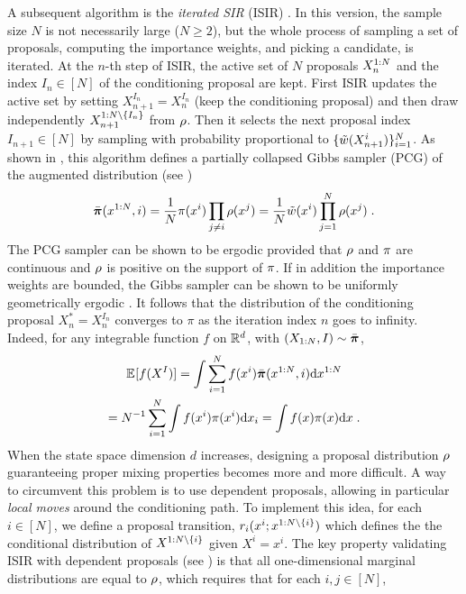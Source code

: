 \documentclass{article}
\begin{document}
A subsequent algorithm  is the \emph{iterated SIR} (ISIR) \citep{andrieu2010particle}. In this version, the sample size $N$ is not necessarily large ($N\geq 2$), but the whole process of sampling a set of proposals, computing the importance weights, and picking a  candidate, is iterated. At the $n$-th step of ISIR, the
active set of $N$ proposals $X_n^{1:N}$ and the index $I_n \in [N]$ of the conditioning proposal are kept. First ISIR  updates the active set  by setting $X_{n+1}^{I_n}= X_n^{I_n}$ (keep the conditioning proposal) and then draw independently $X_{n+1}^{1:N \setminus \{I_n\}}$ from $\rho$.
Then it selects the next proposal index $I_{n+1} \in [N]$ by sampling with probability
proportional to $\{\tilde{w}(X_{n+1}^i)\}_{i=1}^N$.
As shown in \cite{andrieu2010particle}, this algorithm  defines  a partially collapsed Gibbs sampler (PCG) of the augmented distribution (see )
$$%
\bar{\measpi}(\chunku{x}{1}{N},i)=\frac{1}{N}  \target(x^i) \prod_{j \neq i} \proposal(x^j) =\frac{1}{N} \weightfunc(x^i) \prod_{j=1}^N \proposal(x^j) \eqsp.
$$%
The PCG sampler can be shown to be ergodic provided that $\rho$ and $\pi$ are continuous and $\rho$  is  positive on the support of $\pi$. If in addition the importance weights are bounded, the Gibbs sampler can be shown to be uniformly geometrically ergodic  \citep{lindsten2015uniform,andrieu2018uniform}.
It follows that the distribution of the conditioning proposal $X_n^*= X_n^{I_n}$ converges to $\pi$ as the iteration index $n$ goes to infinity. Indeed, for any integrable function $f$ on $\mathbb{R}^d$, with $(X_{1:N},I) \sim \bar{\boldsymbol{\pi}}$,
\begin{multline*}
\allowdisplaybreaks
\PE_{}[f(X^I)]= \int \sum_{i=1}^N f(x^i)  \bar{\measpi}(\chunku{x}{1}{N},i) \rmd \chunku{x}{1}{N} \\
\allowdisplaybreaks
= N^{-1} \sum_{i=1}^N \int f(x^i) \target(x^i) \rmd x_i = \int f(x) \target(x) \rmd x \eqsp.
\end{multline*}
When the state space dimension $d$ increases, designing a proposal distribution $\rho$ guaranteeing proper mixing properties becomes more and more difficult. A way to circumvent this problem is to use dependent proposals, allowing in particular \emph{local moves} around the conditioning path. To implement this idea, for each $i \in [N]$, we define a proposal transition, $r_i(x^i; x^{1:N \setminus \{i\}})$ which defines the the conditional distribution of $X^{1:N \setminus \{i\}}$ given  $X^i= x^i$. The key property validating ISIR with dependent proposals (see ) is that all one-dimensional marginal distributions are equal to $\rho$, which requires that for each $i,j  \in [N]$,
\end{document}
